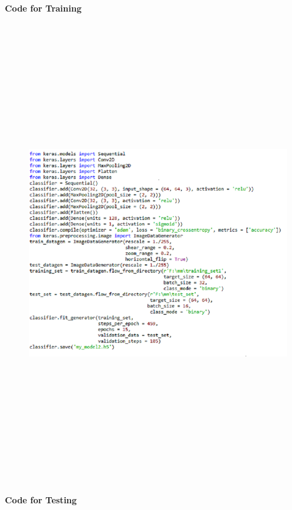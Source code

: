 \documentclass[a4paper,12pt,oneside]{article}
\begin{document}
\textbf{Code for Training }
\begin{figure}[H]
\centering
\includegraphics[height=20cm,width=15cm]{codecnn.PNG}
\end{figure}
\newpage
\textbf{Code for Testing }
\end{document}
